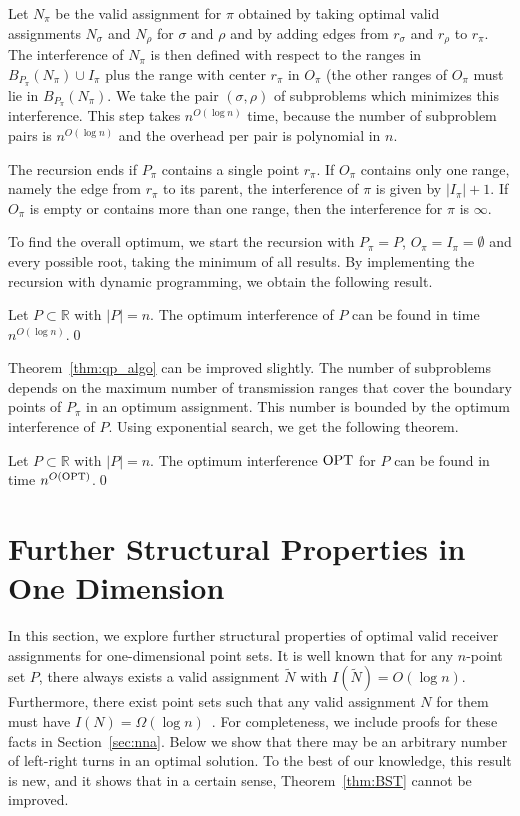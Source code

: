 \documentclass[envcountsect,envcountsame,runningheads,a4paper]{llncs}
\newcommand\R{{\mathbb R}}
\begin{document}
Let $N_\pi$ be the valid assignment for $\pi$ obtained
by taking optimal valid assignments $N_\sigma$ and $N_\rho$
for $\sigma$ and $\rho$ and
by adding edges from $r_\sigma$ and $r_\rho$ to $r_\pi$.
The interference of $N_\pi$ is then defined with respect to
the ranges in $B_{P_\pi}(N_\pi) \cup I_\pi$ plus the range with
center $r_\pi$ in $O_\pi$ (the other ranges of $O_\pi$ must lie in
$B_{P_{\pi}}(N_\pi)$. We take the
pair $(\sigma, \rho)$ of subproblems which minimizes this interference.
This step takes $n^{O(\log n)}$ time, because the number
of subproblem pairs is $n^{O(\log n)}$ and the overhead per pair is
polynomial in $n$.

The recursion ends if $P_\pi$ contains a single point $r_\pi$. If $O_\pi$
contains only one range, namely the edge from $r_\pi$ to its parent, the
interference of $\pi$ is given by $|I_\pi|+1$.
If $O_\pi$ is empty or contains more than one range, then
the interference for $\pi$ is $\infty$.

To find the overall optimum, we start the recursion with
$P_\pi = P$, $O_\pi=I_\pi=\emptyset$ and every possible root, taking the
minimum of all results. By implementing the recursion with dynamic programming,
we obtain the following result.

\begin{theorem}\label{thm:qp_algo}
Let $P \subset \R$ with $|P| = n$. The optimum interference of $P$ can be
found in time $n^{O(\log n)}$.\qed
\end{theorem}

Theorem~\ref{thm:qp_algo} can be improved slightly. The number of subproblems
depends on the maximum number of transmission ranges that cover the boundary points
of $P_\pi$ in an optimum assignment. This number is bounded by the optimum
interference of $P$.  Using exponential search, we get the following
theorem.
\begin{theorem}
Let $P \subset \R$ with $|P|= n$. The optimum
interference $\textup{OPT}$ for $P$ can be found in time
$n^{O(\textup{OPT})}$.\qed
\end{theorem}

\section{Further Structural Properties in One Dimension}\label{sec:further}

In this section, we explore further structural properties of
optimal valid receiver assignments for one-dimensional point sets.
It is well known that for any $n$-point set $P$, there always exists a valid assignment $\widetilde{N}$ with
$I(\widetilde{N}) = O(\log n)$. Furthermore, there exist point sets such that
any valid assignment $N$ for them must have $I(N) = \Omega(\log n)$~\cite{RickenbachWaZo09}.
For completeness, we include proofs for these facts in Section~\ref{sec:nna}. 
Below we show that there may be an arbitrary number
of left-right turns in an optimal solution. To the best of our knowledge, this result is new, and
it shows that in a certain sense, Theorem~\ref{thm:BST} cannot be improved.
\end{document}
